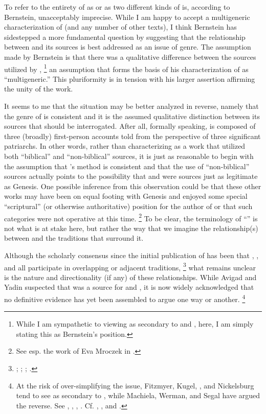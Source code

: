 To refer to the entirety of \ga as \rwb or as two different kinds of \rwb is, according to Bernstein, unacceptably imprecise. While I am happy to accept a multigeneric characterization of \ga (and any number of other texts), I think Bernstein has sidestepped a more fundamental question by suggesting that the relationship between \ga and its sources is best addressed as an issue of genre. The assumption made by Bernstein is that there was a qualitative difference between the sources utilized by \ga,%
    \footnote{While I am sympathetic to viewing \ga as secondary to \jub and \firstenoch, here, I am simply stating this as Bernstein's position.}
an assumption that forms the basis of his characterization of \ga as ``multigeneric.'' This pluriformity is in tension with his larger assertion affirming the unity of the work. 

It seems to me that the situation may be better analyzed in reverse, namely that the genre of \ga is consistent and it is the assumed qualitative distinction between its sources that should be interrogated. After all, formally speaking, \ga is composed of three (broadly) first-person accounts told from the perspective of three significant patriarchs. In other words, rather than characterizing \ga as a work that utilized both ``biblical'' and ``non-biblical'' sources, it is just as reasonable to begin with the assumption that \ga's method is consistent and that the use of ``non-biblical'' sources actually points to the possibility that \jub and \firstenoch were sources just as legitimate as Genesis. One possible inference from this observation could be that these other works may have been on equal footing with Genesis and enjoyed some special ``scriptural'' (or otherwise authoritative) position for the author of \ga or that such categories were not operative at this time.%
    \footnote{See esp. the work of Eva Mroczek in \cite*[114--155]{mroczek2016}.} To be clear, the terminology of ``\rwb'' is not what is at stake here, but rather the way that we imagine the relationship(s) between \ga and the traditions that surround it.

Although the scholarly consensus since the initial publication of \ga has been that \firstenoch, \jub, and \ga all participate in overlapping or adjacent traditions,%
    \footnote{\Cite[38]{avigad-yadin1956}; \cite[20--22]{fitzmyer2004}; \cite[110--116]{crawford2008}; \cite[8--19]{machiela2009}.}
what remains unclear is the nature and directionality (if any) of these relationships. While Avigad and Yadin suspected that \ga was a source for \firstenoch and \jub,%
    \autocite[38]{avigad-yadin1956}
it is now widely acknowledged that no definitive evidence has yet been assembled to argue one way or another.%
    \footnote{At the risk of over-simplifying the issue, Fitzmyer, Kugel, \vanderkam, and Nickelsburg tend to see \ga as secondary to \jub, while Machiela, Werman, and Segal have argued the reverse. See \cite{vanderkam_feldman-etal2017}, \cite[20--22]{fitzmyer2004}, \cite[174]{nickelsburg2005}, \cite[305--342]{kugel2012}. Cf. \cite{segal_as2010}, \cite[140--142]{machiela2009}, and \cite[171--177]{werman_chazon-etal1999}.}

